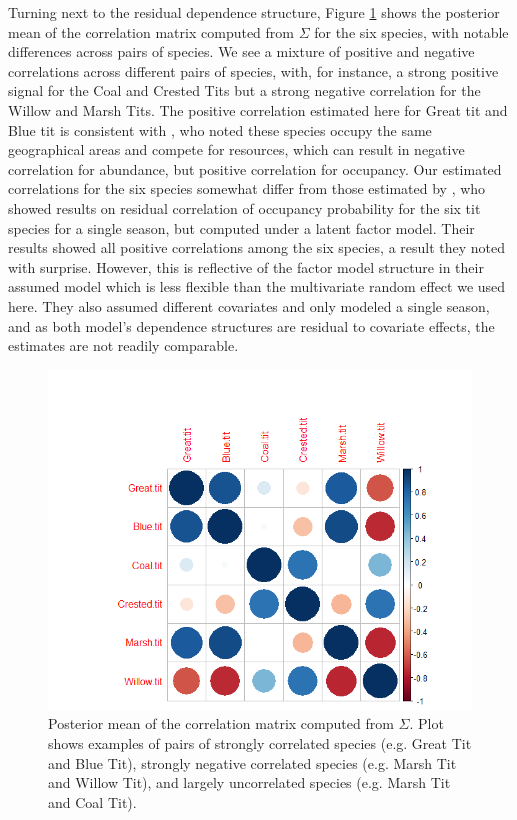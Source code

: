 Turning next to the residual dependence structure, Figure \ref{figure:corr} shows the posterior mean of the correlation matrix computed from $\Sigma$ for the six species, with notable differences across pairs of species. We see a mixture of positive and negative correlations across different pairs of species, with, for instance, a strong positive signal for the Coal and Crested Tits but a strong negative correlation for the Willow and Marsh Tits. The positive correlation estimated here for Great tit and Blue tit is consistent with \citet{stenseth2015testing}, who noted these species occupy the same geographical areas and compete for resources, which can result in negative correlation for abundance, but positive correlation for occupancy. Our estimated correlations for the six species somewhat differ from those estimated by \citet{tobler2019joint}, who showed results on residual correlation of occupancy probability for the six tit species for a single season, but computed under a latent factor model. Their results showed all positive correlations among the six species, a result they noted with surprise.  However, this is reflective of the factor model structure in their assumed model which is less flexible than the multivariate random effect we used here. They also assumed different covariates and only modeled a single season, and as both model's dependence structures are residual to covariate effects, the estimates are not readily comparable.

\begin{figure}[htbp]
  \centering
  \includegraphics[trim= 0cm 0cm 0 1cm, clip, width=4.75in]{SigmaSharp.png}
  \caption{Posterior mean of the correlation matrix computed from $\Sigma$.  Plot shows examples of pairs of strongly correlated species (e.g. Great Tit and Blue Tit), strongly negative correlated species (e.g. Marsh Tit and Willow Tit), and largely uncorrelated species (e.g. Marsh Tit and Coal Tit).}
  \label{figure:corr}
\end{figure}

